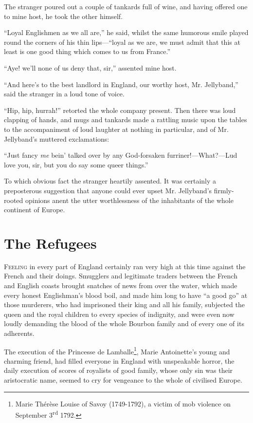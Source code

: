 \documentclass[paper=5.5in:8.5in,BCOR=7mm,twoside,DIV=calc,12pt,usegeometry,chapterprefix,endperiod,headings=big]{scrbook}
\begin{document}
The stranger poured out a couple of tankards full of wine, and having offered one to mine host, he took the other himself.

\enquote{Loyal Englishmen as we all are,} he said, whilst the same humorous smile played round the corners of his thin lips---\enquote{loyal as we are, we must admit that this at least is one good thing which comes to us from France.}

\enquote{Aye! we'll none of us deny that, sir,} assented mine host.

\enquote{And here's to the best landlord in England, our worthy host, Mr. Jellyband,} said the stranger in a loud tone of voice.

\enquote{Hip, hip, hurrah!} retorted the whole company present. Then there was loud clapping of hands, and mugs and tankards made a rattling music upon the tables to the accompaniment of loud laughter at nothing in particular, and of Mr. Jellyband's muttered exclamations:

\enquote{Just fancy \textit{me} bein’ talked over by any God-forsaken furriner!---What?---Lud love you, sir, but you do say some queer things.}

To which obvious fact the stranger heartily assented. It was certainly a preposterous suggestion that anyone could ever upset Mr. Jellyband's firmly-rooted opinions anent the utter worthlessness of the inhabitants of the whole continent of Europe.

\chapter{The Refugees}
\lettrine[lines=4]{F}{eeling} in every part of England certainly ran very high at this time against the French and their doings. Smugglers and legitimate traders between the French and English coasts brought snatches of news from over the water, which made every honest Englishman's blood boil, and made him long to have \enquote{a good go} at those murderers, who had imprisoned their king and all his family, subjected the queen and the royal children to every species of indignity, and were even now loudly demanding the blood of the whole Bourbon family and of every one of its adherents.

The execution of the Princesse de Lamballe\footnote{Marie Thérèse Louise of Savoy (1749-1792), a victim of mob violence on September 3\textsuperscript{rd} 1792.}, Marie Antoinette's young and charming friend, had filled everyone in England with unspeakable horror, the daily execution of scores of royalists of good family, whose only sin was their aristocratic name, seemed to cry for vengeance to the whole of civilised Europe.
\end{document}
